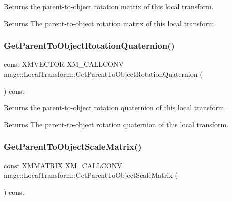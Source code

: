 Returns the parent-\/to-\/object rotation matrix of this local transform.

\begin{DoxyReturn}{Returns}
The parent-\/to-\/object rotation matrix of this local transform. 
\end{DoxyReturn}
\mbox{\label{classmage_1_1_local_transform_a66e6d3320e87461203f91599e23ee6c1}} 
\subsubsection{\texorpdfstring{Get\+Parent\+To\+Object\+Rotation\+Quaternion()}{GetParentToObjectRotationQuaternion()}}
{\footnotesize\ttfamily const X\+M\+V\+E\+C\+T\+OR X\+M\+\_\+\+C\+A\+L\+L\+C\+O\+NV mage\+::\+Local\+Transform\+::\+Get\+Parent\+To\+Object\+Rotation\+Quaternion (\begin{DoxyParamCaption}{ }\end{DoxyParamCaption}) const\hspace{0.3cm}{\ttfamily [noexcept]}}

Returns the parent-\/to-\/object rotation quaternion of this local transform.

\begin{DoxyReturn}{Returns}
The parent-\/to-\/object rotation quaternion of this local transform. 
\end{DoxyReturn}
\mbox{\label{classmage_1_1_local_transform_a81ef828c64270716e5095f2cf571fad7}} 
\subsubsection{\texorpdfstring{Get\+Parent\+To\+Object\+Scale\+Matrix()}{GetParentToObjectScaleMatrix()}}
{\footnotesize\ttfamily const X\+M\+M\+A\+T\+R\+IX X\+M\+\_\+\+C\+A\+L\+L\+C\+O\+NV mage\+::\+Local\+Transform\+::\+Get\+Parent\+To\+Object\+Scale\+Matrix (\begin{DoxyParamCaption}{ }\end{DoxyParamCaption}) const\hspace{0.3cm}{\ttfamily [noexcept]}}

